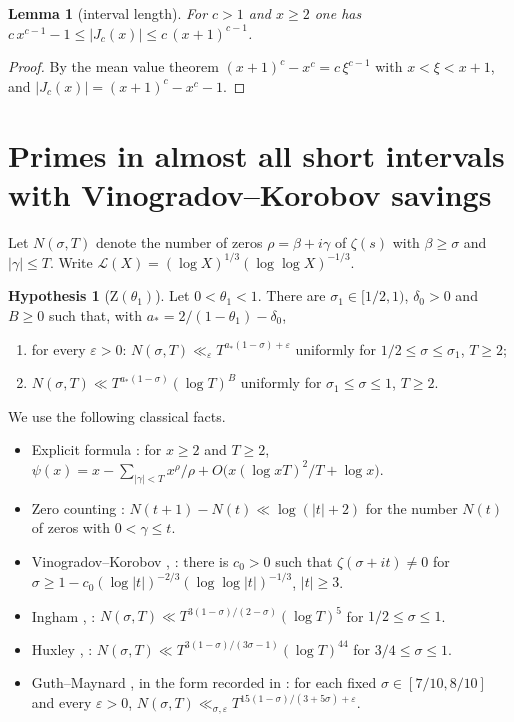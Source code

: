\documentclass[11pt,a4paper]{article}
\newtheorem{lemma}[theorem]{Lemma}
\theoremstyle{definition}
\newtheorem{hypothesis}[theorem]{Hypothesis}
\newcommand{\eps}{\varepsilon}
\begin{document}
\begin{lemma}[interval length]\label{lem:length}
For $c>1$ and $x\ge2$ one has $c\,x^{c-1}-1\le |J_c(x)|\le c\,(x+1)^{c-1}$.
\end{lemma}

\begin{proof}
By the mean value theorem $(x+1)^c-x^c=c\,\xi^{c-1}$ with $x<\xi<x+1$, and $|J_c(x)|=(x+1)^c-x^c-1$.
\end{proof}

\section{Primes in almost all short intervals with Vinogradov--Korobov savings}\label{sec:aa}

Let $N(\sigma,T)$ denote the number of zeros $\rho=\beta+i\gamma$ of $\zeta(s)$ with $\beta\ge\sigma$ and
$|\gamma|\le T$. Write $\mathcal L(X)=(\log X)^{1/3}(\log\log X)^{-1/3}$.

\begin{hypothesis}[$\mathrm Z(\theta_1)$]\label{hyp:Z}
Let $0<\theta_1<1$. There are $\sigma_1\in[1/2,1)$, $\delta_0>0$ and $B\ge0$ such that, with
$a_*=2/(1-\theta_1)-\delta_0$,
\begin{enumerate}[label=\textup{(\alph*)}]
\item for every $\eps>0$: $N(\sigma,T)\ll_\eps T^{a_*(1-\sigma)+\eps}$ uniformly for $1/2\le\sigma\le\sigma_1$, $T\ge2$;
\item $N(\sigma,T)\ll T^{a_*(1-\sigma)}(\log T)^B$ uniformly for $\sigma_1\le\sigma\le1$, $T\ge2$.
\end{enumerate}
\end{hypothesis}

We use the following classical facts.
\begin{itemize}[leftmargin=1.5em]
\item[(F1)] Explicit formula \cite[Ch.~17]{Dav00}: for $x\ge2$ and $T\ge2$,
$\psi(x)=x-\sum_{|\gamma|<T}x^\rho/\rho+O\bigl(x(\log xT)^2/T+\log x\bigr)$.
\item[(F2)] Zero counting \cite[Ch.~15]{Dav00}: $N(t+1)-N(t)\ll\log(|t|+2)$ for the number $N(t)$ of zeros with $0<\gamma\le t$.
\item[(F3)] Vinogradov--Korobov \cite[Thm.~6.1]{Ivi85}, \cite{For02}: there is $c_0>0$ such that $\zeta(\sigma+it)\neq0$ for
$\sigma\ge1-c_0(\log|t|)^{-2/3}(\log\log|t|)^{-1/3}$, $|t|\ge3$.
\item[(F4)] Ingham \cite{Ing40}, \cite[Ch.~11]{Ivi85}: $N(\sigma,T)\ll T^{3(1-\sigma)/(2-\sigma)}(\log T)^5$ for $1/2\le\sigma\le1$.
\item[(F5)] Huxley \cite{Hux72}, \cite[Ch.~11]{Ivi85}: $N(\sigma,T)\ll T^{3(1-\sigma)/(3\sigma-1)}(\log T)^{44}$ for $3/4\le\sigma\le1$.
\item[(F6)] Guth--Maynard \cite{GM24}, in the form recorded in \cite[``Guth--Maynard bound'']{expdb}: for each fixed $\sigma\in[7/10,8/10]$
and every $\eps>0$, $N(\sigma,T)\ll_{\sigma,\eps} T^{15(1-\sigma)/(3+5\sigma)+\eps}$.
\end{itemize}
\end{document}
